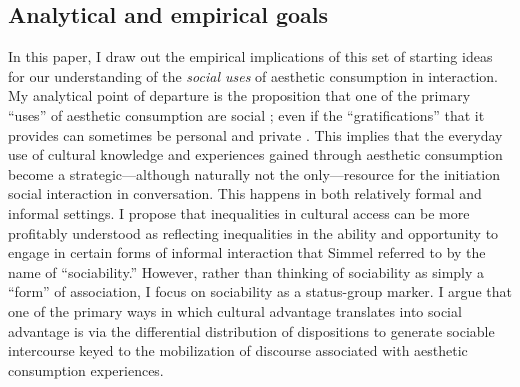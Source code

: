 \subsection{Analytical and empirical goals}
In this paper, I draw out the empirical implications of this set of starting ideas for our understanding of the \emph{social uses} of aesthetic consumption in interaction.  My analytical point of departure is the proposition that one of the primary ``uses'' of aesthetic consumption are social \citep{dimaggio87};  even if the ``gratifications'' that it provides can sometimes be personal and private  \citep{denora00, hennion01, holbrook_hirschman82}.  This implies that the everyday use of cultural knowledge and experiences gained through aesthetic consumption become a strategic---although naturally not the only---resource for the initiation social interaction in conversation.  This happens in both relatively formal \citep{long03} and informal \citep{fine77} settings.   I propose that inequalities in cultural access can be more profitably understood as reflecting inequalities in the ability and opportunity to engage in certain forms of informal interaction that Simmel \citeyearpar{simmel49} referred to by the name of ``sociability.''  However, rather than thinking of sociability as simply a ``form'' of association, I focus on sociability as a status-group marker. I argue that one of the primary ways in which cultural advantage translates into social advantage is via the differential distribution of dispositions to generate sociable intercourse keyed to the mobilization of discourse associated with aesthetic consumption experiences.

